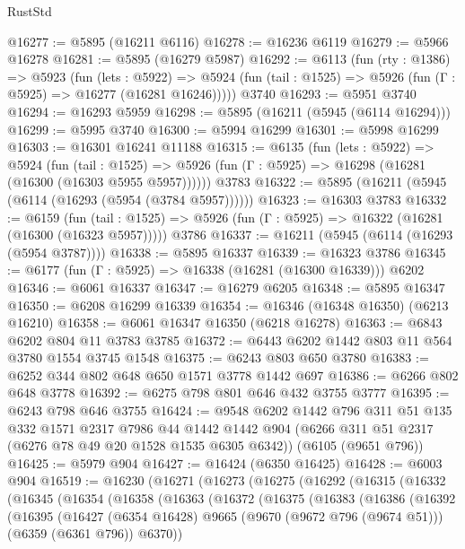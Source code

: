 \begin{lexlean}{RustStd}
\begin{coremodule}
{{@16277 := @5895 (@16211 @6116)
@16278 := @16236 @6119
@16279 := @5966 @16278
@16281 := @5895 (@16279 @5987)
@16292 := @6113
    (fun (rty : @1386) =>
    @5923
      (fun (lets : @5922) =>
      @5924 (fun (tail : @1525) => @5926 (fun (Γ : @5925) => @16277 (@16281 @16246)))))
    @3740
@16293 := @5951 @3740
@16294 := @16293 @5959
@16298 := @5895 (@16211 (@5945 (@6114 @16294)))
@16299 := @5995 @3740
@16300 := @5994 @16299
@16301 := @5998 @16299
@16303 := @16301 @16241 @11188
@16315 := @6135
    (fun (lets : @5922) =>
    @5924
      (fun (tail : @1525) =>
      @5926 (fun (Γ : @5925) => @16298 (@16281 (@16300 (@16303 @5955 @5957))))))
    @3783
@16322 := @5895 (@16211 (@5945 (@6114 (@16293 (@5954 (@3784 @5957))))))
@16323 := @16303 @3783
@16332 := @6159
    (fun (tail : @1525) => @5926 (fun (Γ : @5925) => @16322 (@16281 (@16300 (@16323 @5957)))))
    @3786
@16337 := @16211 (@5945 (@6114 (@16293 (@5954 @3787))))
@16338 := @5895 @16337
@16339 := @16323 @3786
@16345 := @6177 (fun (Γ : @5925) => @16338 (@16281 (@16300 @16339))) @6202
@16346 := @6061 @16337
@16347 := @16279 @6205
@16348 := @5895 @16347
@16350 := @6208 @16299 @16339
@16354 := @16346 (@16348 @16350) (@6213 @16210)
@16358 := @6061 @16347 @16350 (@6218 @16278)
@16363 := @6843 @6202 @804 @11 @3783 @3785
@16372 := @6443 @6202 @1442 @803 @11 @564 @3780 @1554 @3745 @1548
@16375 := @6243 @803 @650 @3780
@16383 := @6252 @344 @802 @648 @650 @1571 @3778 @1442 @697
@16386 := @6266 @802 @648 @3778
@16392 := @6275 @798 @801 @646 @432 @3755 @3777
@16395 := @6243 @798 @646 @3755
@16424 := @9548
    @6202
    @1442
    @796
    @311
    @51
    @135
    @332
    @1571
    @2317
    @7986
    @44
    @1442
    @1442
    @904
    (@6266 @311 @51 @2317 (@6276 @78 @49 @20 @1528 @1535 @6305 @6342))
    (@6105 (@9651 @796))
@16425 := @5979 @904
@16427 := @16424 (@6350 @16425)
@16428 := @6003 @904
@16519 := @16230
    (@16271
      (@16273
        (@16275
          (@16292
            (@16315
              (@16332
                (@16345
                  (@16354
                    (@16358
                      (@16363
                        (@16372
                          (@16375
                            (@16383
                              (@16386
                                (@16392
                                  (@16395
                                    (@16427
                                      (@6354 @16428)
                                      @9665
                                      (@9670 (@9672 @796 (@9674 @51)))
                                      (@6359 (@6361 @796))
                                      @6370))
}}
\end{coremodule}
\end{lexlean}
